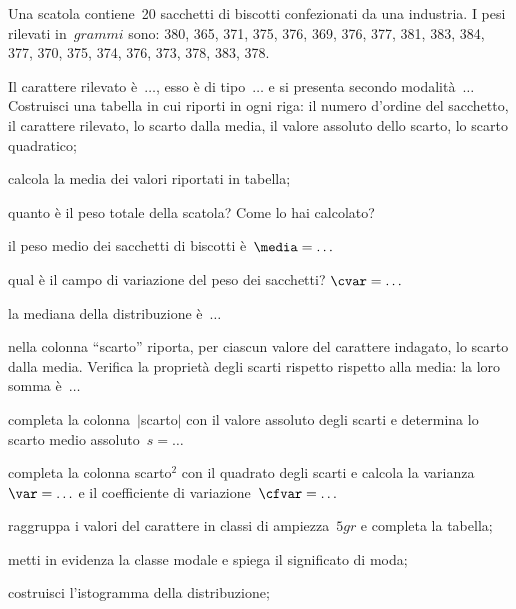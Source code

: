 \begin{esercizio}
\label{ese:A.46}
Una scatola contiene~20 sacchetti di biscotti confezionati da una 
industria. I pesi rilevati in~\(\unit{grammi}\) sono:
380, 365, 371, 375, 376, 369, 376, 377, 381, 383, 384, 377, 370, 375, 374, 
376, 373, 378, 383, 378.
\begin{enumeratea}
 \item Il carattere rilevato è~\(\ldots\), esso è di tipo~\(\ldots\) e si 
presenta secondo modalità~\(\ldots\)
 Costruisci una tabella in cui riporti in ogni riga:
 il numero d'ordine del sacchetto, il carattere rilevato,
 lo scarto dalla media, il valore assoluto dello scarto, 
 lo scarto quadratico;
 \item calcola la media dei valori riportati in tabella;
 \item quanto è il peso totale della scatola? Come lo hai calcolato?
 \item il peso medio dei sacchetti di biscotti è~\(\media = \ldots\)
 \item qual è il campo di variazione del peso dei sacchetti? \(\cvar = 
\ldots\)
 \item la mediana della distribuzione è~\(\ldots\)
 \item nella colonna ``scarto'' riporta, per ciascun valore del carattere 
indagato, lo scarto dalla media.
 Verifica la proprietà degli scarti rispetto rispetto alla media: la loro 
somma è~\(\ldots\)
 \item completa la colonna~\(\vert\)scarto\(\vert\) con il valore assoluto 
degli scarti e determina lo scarto medio assoluto~\(s = \dots\)
 \item completa la colonna scarto\(^2\) con il quadrato degli scarti e 
calcola la varianza~\(\var = \ldots\) e
 il coefficiente di variazione~\(\cfvar = \ldots\)
 \item raggruppa i valori del carattere in classi di ampiezza~\(5 \unit{gr}\) 
e completa la tabella;
 \item metti in evidenza la classe modale e spiega il significato di moda;
 \item costruisci l'istogramma della distribuzione;


\end{enumeratea}
\end{esercizio}
